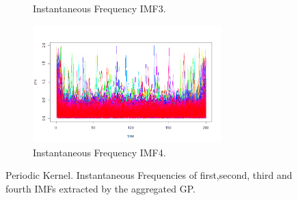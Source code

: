 \documentclass[11pt, a4paper]{article} %
\begin{document}
\begin{landscape}
\begin{figure}
\begin{subfigure}[b]{0.475\hsize}
            \caption[]%
            {{\small Instantaneous Frequency IMF3.}}
        \end{subfigure}
        \quad
        \begin{subfigure}[b]{0.475\hsize}\centering   
            \centering 
            \includegraphics[width=0.8\textwidth]{IF4_Ex2.png}
            \caption[]%
            {{\small Instantaneous Frequency IMF4.}}
        \end{subfigure}
        \caption[  ]
        {\small Periodic Kernel. Instantaneous Frequencies of first,second, third and fourth IMFs extracted by the aggregated GP.} 
        \end{figure}
\end{landscape}

\restoregeometry 
\end{document}
